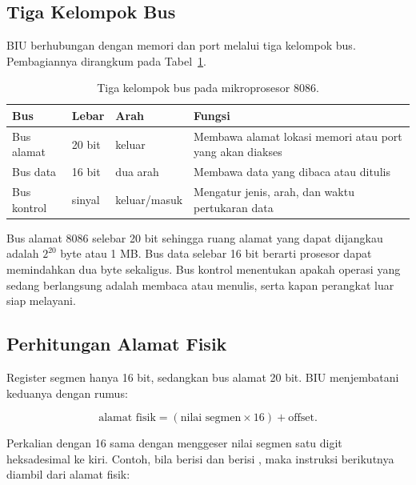 \subsection{Tiga Kelompok Bus}

BIU berhubungan dengan memori dan port melalui tiga kelompok bus.
Pembagiannya dirangkum pada Tabel~\ref{tab:bus}.

\begin{table}[H]
    \centering
    \caption{Tiga kelompok bus pada mikroprosesor 8086.}
    \label{tab:bus}
    \small
    \begin{tabular}{@{}p{2.7cm}p{1.8cm}p{2.4cm}p{6.0cm}@{}}
        \toprule
        \textbf{Bus} & \textbf{Lebar} & \textbf{Arah} &
        \textbf{Fungsi} \\
        \midrule
        Bus alamat & 20 bit & keluar & Membawa alamat lokasi memori
        atau port yang akan diakses \\
        \addlinespace
        Bus data & 16 bit & dua arah & Membawa data yang dibaca atau
        ditulis \\
        \addlinespace
        Bus kontrol & sinyal & keluar/masuk & Mengatur jenis, arah,
        dan waktu pertukaran data \\
        \bottomrule
    \end{tabular}
\end{table}

Bus alamat 8086 selebar 20 bit sehingga ruang alamat yang dapat
dijangkau adalah $2^{20}$ byte atau 1 MB. Bus data selebar 16 bit
berarti prosesor dapat memindahkan dua byte sekaligus. Bus kontrol
menentukan apakah operasi yang sedang berlangsung adalah membaca
atau menulis, serta kapan perangkat luar siap melayani.

\subsection{Perhitungan Alamat Fisik}

Register segmen hanya 16 bit, sedangkan bus alamat 20 bit. BIU
menjembatani keduanya dengan rumus:

\begin{equation}
    \text{alamat fisik} = (\text{nilai segmen} \times 16)
    + \text{offset}.
    \label{eq:alamat-fisik}
\end{equation}

Perkalian dengan 16 sama dengan menggeser nilai segmen satu digit
heksadesimal ke kiri. Contoh, bila  berisi  dan
 berisi , maka instruksi berikutnya diambil dari
alamat fisik:

